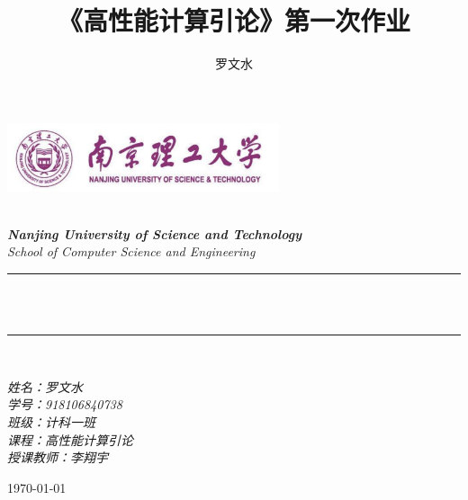 \documentclass[12pt]{article}
\title{《高性能计算引论》第一次作业}
\author{\textup{罗文水}}
\begin{document}
	
	\begin{titlepage}
		\newcommand{\HRule}{\rule{\linewidth}{0.5mm}}
		\begin{center}
			\includegraphics[width=8cm]{title}			
		\end{center}
		
		\center 
		\quad\\[1.5cm]
		\textsl{\Large \textbf{Nanjing University of Science and Technology} }\\[0.5cm] 
		\textsl{\large School of Computer Science and Engineering}\\[0.5cm] 
		\makeatletter
		\HRule \\[0.4cm]
		{ \huge \bfseries \@title}\\[0.25cm] 
		\HRule \\[1.5cm]
	\begin{minipage}{0.42\textwidth}
		\begin{flushleft}
			
			\Large{\emph{姓名：罗文水}}
			\\
			\Large{\emph{学号：918106840738}}
			\\
			\Large{\emph{班级：计科一班}}
			\\
			\Large{\emph{课程：高性能计算引论}}
			\\
			\Large{\emph{授课教师：李翔宇}}
			\\
		\end{flushleft}
	\end{minipage}
		\vspace{7em} 
		
		{\large \today}\\[2cm] 
		\vfill 
	\end{titlepage}
	
	\newpage
\end{document}
